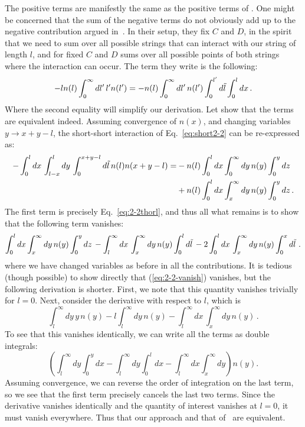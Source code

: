 \documentclass[a4paper,11pt]{article}
\begin{document}
The positive terms are manifestly the same as the positive terms of \cite{Lee:1997iz}.
One might be concerned that the sum of the negative terms do not obviously add up to the negative contribution argued in~\cite{Lee:1997iz}.
In their setup, they fix $C$ and $D$, in the spirit that we need to sum over all possible strings that can interact with our string of length $l$, and for fixed $C$ and $D$ sums over all possible points of both strings where the interaction can occur.
The term they write is the following:
\begin{equation}\label{eq:2-2thorl}
    -ln(l)\int_0^\infty{dl' \, l'n(l')}=-n(l)\int_0^\infty{dl' \, n(l')\int_0^{l'}{d\Tilde{l} }}\int_0^l{dx}\, .
\end{equation}
Where the second equality will simplify our derivation.
Let show that the terms are equivalent indeed.
Assuming convergence of $n(x)$, and changing variables $y\rightarrow x+y-l$, the short-short interaction of Eq.~\eqref{eq:short2-2} can be re-expressed as:
\begin{equation}
\begin{split}
    -\int_0^l{dx\, \int_{l-x}^l{dy\, \int_0^{x+y-l}{d\Tilde{l}\, n(l)n(x+y-l)}}}=&-n(l)\int_0^l{dx}\int_0^\infty{dy \, n(y)\int_0^y{dz}}  \\ 
    &+n(l)\int_0^l{dx}\int_x^\infty{dy\, n(y)\int_0^y{dz}}\, .
\end{split}
\end{equation}
The first term is precisely Eq.~\eqref{eq:2-2thorl}, and thus all what remains is to show that the following term vanishes:
\begin{equation}\label{eq:2-2-vanish}
    \int_0^l{dx}\int_x^\infty{dy\, n(y)\int_0^y{dz}}\, -\int_l^{\infty}{dx\, \int_x^{\infty}{dy \,n(y) \int_0^l{d\Tilde{l}\, }}}-2\int_0^l{dx\, \int_x^{\infty}{dy\,n(y) \int_0^x{d\Tilde{l}\,}}} \, .
\end{equation}
where we have changed variables as before in all the contributions.
It is tedious (though possible) to show directly that (\ref{eq:2-2-vanish})
vanishes, but the following derivation is shorter.
First, we note that this quantity vanishes trivially for $l=0$.
Next, consider the derivative with respect to $l$, which is
\begin{equation}
\int_l^\infty{dy\, y \, n(y)}-l\int_l^\infty{dy\, n(y)}-\int_l^\infty{dx\, \int_x^\infty{dy\, n(y)}}\, .
\end{equation}
To see that this vanishes identically, we can write all the terms as double
integrals:
\begin{equation}\left(\int_l^\infty dy\int_0^y dx-\int_l^\infty dy\int_0^l dx
-\int_l^\infty dx\int_x^\infty dy\right) n(y) .\end{equation}
Assuming convergence, we can reverse the order of integration on the last term,
so we see that the first term precisely cancels the last two terms.
Since the derivative vanishes identically and the quantity of interest vanishes
at $l=0$, it must vanish everywhere.
Thus that our approach and that of~\cite{Lee:1997iz} are equivalent.
\end{document}
